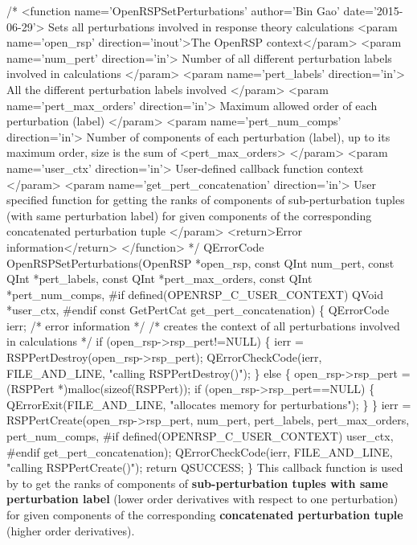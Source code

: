/* <function name='OpenRSPSetPerturbations' author='Bin Gao' date='2015-06-29'>
     Sets all perturbations involved in response theory calculations
     <param name='open_rsp' direction='inout'>The OpenRSP context</param>
     <param name='num_pert' direction='in'>
       Number of all different perturbation labels involved in calculations
     </param>
     <param name='pert_labels' direction='in'>
       All the different perturbation labels involved
     </param>
     <param name='pert_max_orders' direction='in'>
       Maximum allowed order of each perturbation (label)
     </param>
     <param name='pert_num_comps' direction='in'>
       Number of components of each perturbation (label), up to its maximum
       order, size is the sum of <pert_max_orders>
     </param>
     <param name='user_ctx' direction='in'>
       User-defined callback function context
     </param>
     <param name='get_pert_concatenation' direction='in'>
       User specified function for getting the ranks of components of
       sub-perturbation tuples (with same perturbation label) for given
       components of the corresponding concatenated perturbation tuple
     </param>
     <return>Error information</return>
   </function> */
QErrorCode OpenRSPSetPerturbations(OpenRSP *open_rsp,
                                   const QInt num_pert,
                                   const QInt *pert_labels,
                                   const QInt *pert_max_orders,
                                   const QInt *pert_num_comps,
#if defined(OPENRSP_C_USER_CONTEXT)
                                   QVoid *user_ctx,
#endif
                                   const GetPertCat get_pert_concatenation)
\{
    QErrorCode ierr;  /* error information */
    /* creates the context of all perturbations involved in calculations */
    if (open_rsp->rsp_pert!=NULL) \{
        ierr = RSPPertDestroy(open_rsp->rsp_pert);
        QErrorCheckCode(ierr, FILE_AND_LINE, "calling RSPPertDestroy()");
    \}
    else \{
        open_rsp->rsp_pert = (RSPPert *)malloc(sizeof(RSPPert));
        if (open_rsp->rsp_pert==NULL) \{
            QErrorExit(FILE_AND_LINE, "allocates memory for perturbations");
        \}
    \}
    ierr = RSPPertCreate(open_rsp->rsp_pert,
                         num_pert,
                         pert_labels,
                         pert_max_orders,
                         pert_num_comps,
#if defined(OPENRSP_C_USER_CONTEXT)
                         user_ctx,
#endif
                         get_pert_concatenation);
    QErrorCheckCode(ierr, FILE_AND_LINE, "calling RSPPertCreate()");
    return QSUCCESS;
\}
\nwendcode{}This callback function is used by \LibName to get the ranks of components of
\textbf{sub-perturbation tuples with same perturbation label} (lower order
derivatives with respect to one perturbation) for given components of the
corresponding \textbf{concatenated perturbation tuple} (higher order
derivatives).

